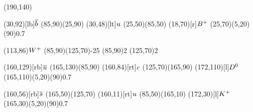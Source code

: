 \documentclass{standalone}
\begin{document}
\begin{axopicture}(190,140)

  \Text(30,92)[lb]{${\overline {{b}}}$}     %
  \Line[arrow](85,90)(25,90)         %
  \Text(30,48)[lt]{${u}$}        %
  \Line[arrow](25,50)(85,50)         %
  \Text(18,70)[r]{${{{B}^+}}$}             %
  \GOval(25,70)(5,20)(90){0.7}       %
                                     
  \Text(113,86){\small{${W^+}$}}       %
  \Photon(85,90)(125,70){-2}{5}      %
  \Vertex(85,90){2}                  %
  \Vertex(125,70){2}                 %
                                     
  \Text(160,129)[rb]{${\overline {{u}}}$}   %
  \Line[arrow](165,130)(85,90)       %
  \Text(160,84)[rt]{${c}$}       %
  \Line[arrow](125,70)(165,90)       %
  \Text(172,110)[l]{${{D}^0}$}           %
  \GOval(165,110)(5,20)(90){0.7}     %
                                     
  \Text(160,56)[rb]{${\overline {{s}}}$}    %
  \Line[arrow](165,50)(125,70)       %
  \Text(160,11)[rt]{${u}$}       %
  \Line[arrow](85,50)(165,10)        %
  \Text(172,30)[l]{${{K}^+}$}            %
  \GOval(165,30)(5,20)(90){0.7}      %
                                     
\end{axopicture}
\end{document}
